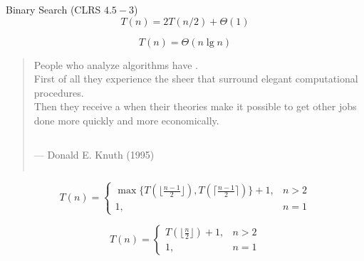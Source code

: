 
\begin{frame}{}
  \begin{exampleblock}{Binary Search (CLRS $4.5-3$)}
    \[
      T(n) = 2T(n/2) + \Theta(1)
    \]

    \[
      T(n) = \Theta(n \lg n)
    \]
  \end{exampleblock}
\end{frame}

\begin{frame}{}

  \begin{quote}
    {\large People who analyze algorithms have . \\[8pt]

    First of all they experience the sheer 
    that surround elegant computational procedures. \\[6pt]

    Then they receive a  when their theories 
    make it possible to get other jobs done more quickly and more economically.} \\[4pt]

    \begin{columns}[t]
	--- Donald E. Knuth (1995)
    \end{columns}
  \end{quote}
\end{frame}

\begin{frame}{}

  \[
    T(n) = \left\{\begin{array}{lr}
      \max\Big\{T(\lfloor \frac{n-1}{2} \rfloor), T(\lceil \frac{n-1}{2} \rceil)\Big\} + 1, & n > 2 \\
      1, & n = 1
  \end{array}\right.
  \]

  \pause
  \vspace{0.30cm}
  \[
    T(n) = \left\{\begin{array}{lr}
      T(\lfloor \frac{n}{2} \rfloor) + 1, & n > 2 \\
      1, & n = 1
    \end{array}\right.
  \]
\end{frame}

